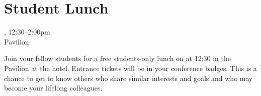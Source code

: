 \clearpage
\section{Student Lunch}
\setheaders{}{\daydateyear}

\begin{center}

\daydateyear, 12:30--2:00pm \vspace{1em}\\
Pavilion \\
\end{center}

Join your fellow students for a free students-only lunch on \daydate
at 12:30 in the Pavilion at the hotel.  Entrance tickets will
be in your conference badges. This is a chance to get to know others
who share similar interests and goals and who may become your lifelong
colleagues.
